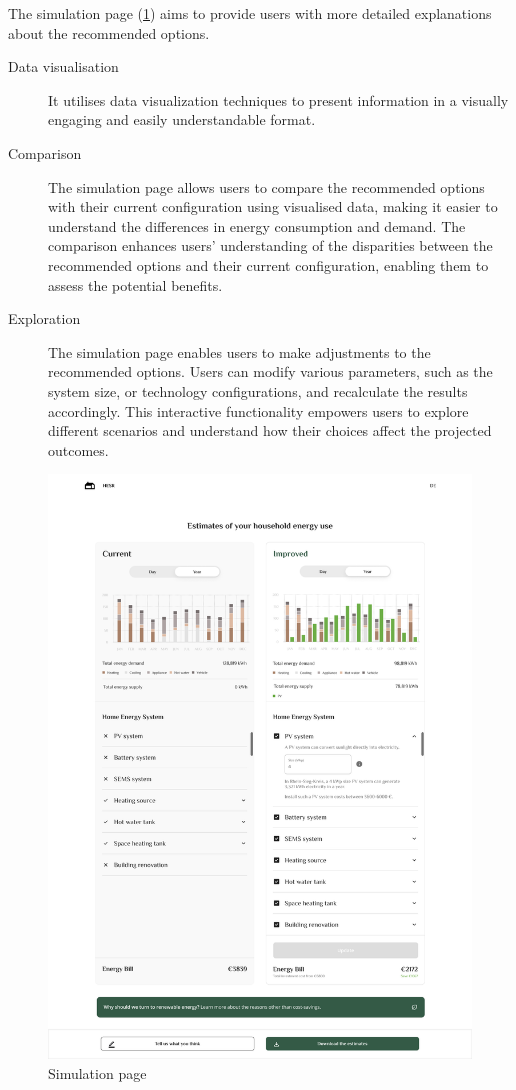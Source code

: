 The simulation page (\ref{fig:explanation}) aims to provide users with more detailed explanations about the recommended options.
\begin{description}
  \item[Data visualisation] It utilises data visualization techniques to present information in a visually engaging and easily understandable format.
  \item[Comparison] The simulation page allows users to compare the recommended options with their current configuration using visualised data, making it easier to understand the differences in energy consumption and demand. 
    The comparison enhances users' understanding of the disparities between the recommended options and their current configuration, enabling them to assess the potential benefits. 
  \item[Exploration] The simulation page enables users to make adjustments to the recommended options. 
    Users can modify various parameters, such as the system size, or technology configurations, and recalculate the results accordingly. 
    This interactive functionality empowers users to explore different scenarios and understand how their choices affect the projected outcomes. 
\end{description}
\begin{figure}[h!]
  \centering
  \includegraphics[width=\textwidth]{Images/explanation.png}
  \caption{Simulation page}
  \label{fig:explanation}
\end{figure}